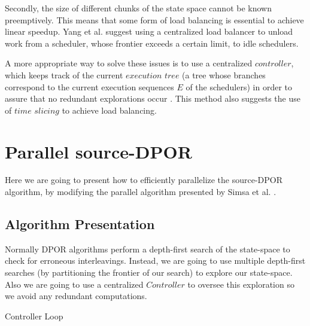 Secondly, the size of different chunks of the state space cannot be known preemptively. This means that some form of load balancing
is essential to achieve linear speedup.
Yang et al. \cite{Yang:2007:DDP:1770532.1770541} suggest using a centralized load balancer to unload work from a scheduler, whose
frontier exceeds a certain limit, to idle schedulers.

A more appropriate way to solve these issues is to use a centralized $controller$, which keeps track of the current 
$execution$ $tree$ (a tree whose branches correspond to the current execution sequences $E$ of the schedulers) in order
to assure that no redundant explorations occur \cite{Simsa2012ScalableDP}. This method also suggests the use of
$time$ $slicing$ to achieve load balancing. 

\section{Parallel source-DPOR}

Here we are going to present how to efficiently parallelize the source-DPOR algorithm, by modifying the parallel algorithm 
presented by Simsa et al. \cite{Simsa2012ScalableDP}.

\subsection{Algorithm Presentation}

Normally DPOR algorithms perform a depth-first search of the state-space to check for erroneous interleavings. Instead, we
are going to use multiple depth-first searches (by partitioning the frontier of our search) to explore our state-space.
Also we are going to use a centralized $Controller$ to oversee this exploration so we avoid any redundant computations.

\begin{algorithm}
    \caption{Controller Loop}
    \label{controllerloop}

\end{algorithm}

